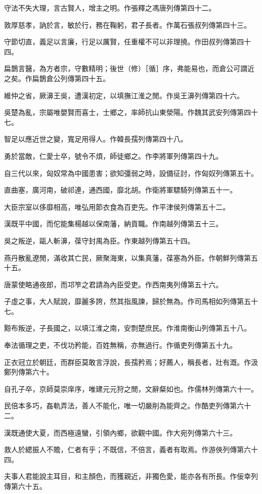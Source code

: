 \begin{pinyinscope}
守法不失大理，言古賢人，增主之明。作張釋之馮唐列傳第四十二。

敦厚慈孝，訥於言，敏於行，務在鞠躬，君子長者。作萬石張叔列傳第四十三。

守節切直，義足以言廉，行足以厲賢，任重權不可以非理撓。作田叔列傳第四十四。

扁鵲言醫，為方者宗，守數精明；後世（修）［循］序，弗能易也，而倉公可謂近之矣。作扁鵲倉公列傳第四十五。

維仲之省，厥濞王吳，遭漢初定，以填撫江淮之閒。作吳王濞列傳第四十六。

吳楚為亂，宗屬唯嬰賢而喜士，士鄉之，率師抗山東滎陽。作魏其武安列傳第四十七。

智足以應近世之變，寬足用得人。作韓長孺列傳第四十八。

勇於當敵，仁愛士卒，號令不煩，師徒鄉之。作李將軍列傳第四十九。

自三代以來，匈奴常為中國患害；欲知彊弱之時，設備征討，作匈奴列傳第五十。

直曲塞，廣河南，破祁連，通西國，靡北胡。作衛將軍驃騎列傳第五十一。

大臣宗室以侈靡相高，唯弘用節衣食為百吏先。作平津侯列傳第五十二。

漢既平中國，而佗能集楊越以保南藩，納貢職。作南越列傳第五十三。

吳之叛逆，甌人斬濞，葆守封禺為臣。作東越列傳第五十四。

燕丹散亂遼閒，滿收其亡民，厥聚海東，以集真藩，葆塞為外臣。作朝鮮列傳第五十五。

唐蒙使略通夜郎，而邛笮之君請為內臣受吏。作西南夷列傳第五十六。

子虛之事，大人賦說，靡麗多誇，然其指風諫，歸於無為。作司馬相如列傳第五十七。

黥布叛逆，子長國之，以填江淮之南，安剽楚庶民。作淮南衡山列傳第五十八。

奉法循理之吏，不伐功矜能，百姓無稱，亦無過行。作循吏列傳第五十九。

正衣冠立於朝廷，而群臣莫敢言浮說，長孺矜焉；好薦人，稱長者，壯有溉。作汲鄭列傳第六十。

自孔子卒，京師莫崇庠序，唯建元元狩之閒，文辭粲如也。作儒林列傳第六十一。

民倍本多巧，姦軌弄法，善人不能化，唯一切嚴削為能齊之。作酷吏列傳第六十二。

漢既通使大夏，而西極遠蠻，引領內鄉，欲觀中國。作大宛列傳第六十三。

救人於緦振人不贍，仁者有乎；不既信，不倍言，義者有取焉。作游俠列傳第六十四。

夫事人君能說主耳目，和主顏色，而獲親近，非獨色愛，能亦各有所長。作佞幸列傳第六十五。


\end{pinyinscope}
